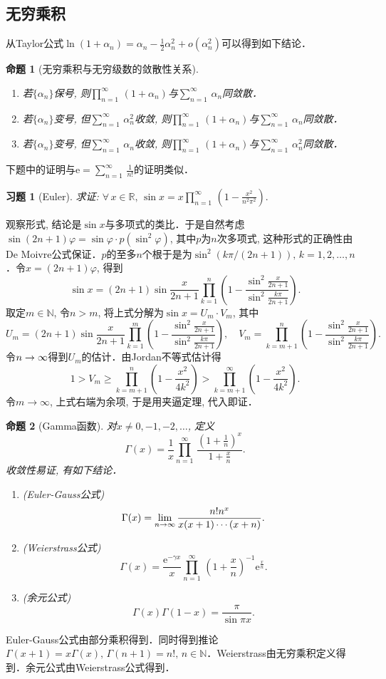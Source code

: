 \documentclass[11pt,a4paper]{ctexart}
\makeatletter
\theoremstyle{thmseries} %
\newtheorem{prop}{命题}[section]
\theoremstyle{exerseries}
\newtheorem{exer}{习题}[section]
\renewenvironment{proof}[1][\proofname]{\par
  \pushQED{\qed}%
  \normalfont \topsep6\p@\@plus6\p@\relax
  \trivlist
  \item[\hskip\labelsep
        \itshape
    #1\@addpunct{}]\ignorespaces
}{%
  \popQED\endtrivlist\@endpefalse
}
\newenvironment{pf}{\begin{proof}[\bfseries\upshape 证\quad]}{\end{proof}}
\newcommand{\bra}[1]{\mathopen{}\left(#1\right)}
\renewcommand{\phi}{\varphi}
\newcommand{\R}{\mathbb{R}}
\newcommand{\N}{\mathbb{N}}
\newcommand{\e}{\mathrm{e}}
\def \nti {\mathnormal{n}\to\infty}
\def \tseries {{\textstyle\sum\limits_{n=1}^{\infty}}\,} %
\def \tprod {{\textstyle\prod\limits_{n=1}^{\infty}}\,} %
\def \dprod {\prod_{n=1}^{\infty}\,} %
\makeatother
\begin{document}
\subsection{无穷乘积}
从Taylor公式$\ln(1+\alpha_n)=\alpha_n-\frac{1}{2}\alpha_n^2+o(\alpha_n^2)$可以得到如下结论．
\begin{prop}[无穷乘积与无穷级数的敛散性关系]
	\phantom{text}
	\begin{enumerate}
		\item 若$\{\alpha_n\}$保号, 则$\tprod(1+\alpha_n)$与$\tseries\alpha_n$同敛散．
		\item 若$\{\alpha_n\}$变号, 但$\tseries\alpha_n^2$收敛, 则$\tprod(1+\alpha_n)$与$\tseries\alpha_n$同敛散．
		\item 若$\{\alpha_n\}$变号, 但$\tseries\alpha_n$收敛, 则$\tprod(1+\alpha_n)$与$\tseries\alpha_n^2$同敛散．
	\end{enumerate}
\end{prop}

下题中的证明与$\e=\tseries\frac{1}{n!}$的证明类似．\vspace{-.5em}
\begin{exer}[Euler]
	求证: $\forall\,x\in\R,\,\sin x=x\tprod\bra{1-\frac{x^2}{n^2\pi^2}}.$
\end{exer}
\begin{pf}
	观察形式, 结论是$\sin x$与多项式的类比．于是自然考虑$\sin(2n+1)\phi=\sin\phi\cdot p(\sin^2\phi)$, 其中$p$为$n$次多项式, 这种形式的正确性由De Moivre公式保证．$p$的至多$n$个根于是为$\sin^2\bra{k\pi/(2n+1)},\,k=1,2,\dots,n$．令$x=(2n+1)\phi$, 得到
	\[\sin x=(2n+1)\sin\frac{x}{2n+1}\prod_{k=1}^{n}\bra{1-\frac{\sin^2\frac{x}{2n+1}}{\sin^2\frac{k\pi}{2n+1}}}.\]
	取定$m\in\N$, 令$n>m$, 将上式分解为$\sin x=U_m\cdot V_m$, 其中
	\[U_m=(2n+1)\sin\frac{x}{2n+1}\prod_{k=1}^{m}\bra{1-\frac{\sin^2\frac{x}{2n+1}}{\sin^2\frac{k\pi}{2n+1}}},\quad V_m=\prod_{k=m+1}^{n}\bra{1-\frac{\sin^2\frac{x}{2n+1}}{\sin^2\frac{k\pi}{2n+1}}}.\]
	令$\nti$得到$U_m$的估计．由Jordan不等式估计得
	\[1>V_m\geq\prod_{k=m+1}^{n}\bra{1-\frac{x^2}{4k^2}}>\prod_{k=m+1}^{\infty}\bra{1-\frac{x^2}{4k^2}}.\]
	令$m\to\infty$, 上式右端为余项, 于是用夹逼定理, 代入即证．
\end{pf}

\begin{prop}[Gamma函数]
	对$x\neq0,-1,-2,\dots$, 定义
	\[\Gamma(x)=\frac{1}{x}\dprod\frac{\bra{1+\frac{1}{n}}^x}{1+\frac{x}{n}}.\]
	收敛性易证, 有如下结论．
	\begin{enumerate}
		\item (Euler-Gauss公式)
		\[\Gamma(x)=\lim_{\nti}\frac{n!n^x}{x(x+1)\cdots(x+n)}.\]
		\item (Weierstrass公式)
		\[\Gamma(x)=\frac{\e^{-\gamma x}}{x}\dprod\bra{1+\frac{x}{n}}^{-1}\e^\frac{x}{n}.\]
		\item (余元公式)
		\[\Gamma(x)\Gamma(1-x)=\frac{\pi}{\sin\pi x}.\]
	\end{enumerate}
\end{prop}
\begin{pf}
	Euler-Gauss公式由部分乘积得到．同时得到推论$\Gamma(x+1)=x\Gamma(x),\,\Gamma(n+1)=n!,\,n\in\N$．Weierstrass由无穷乘积定义得到．余元公式由Weierstrass公式得到．
\end{pf}
\end{document}
